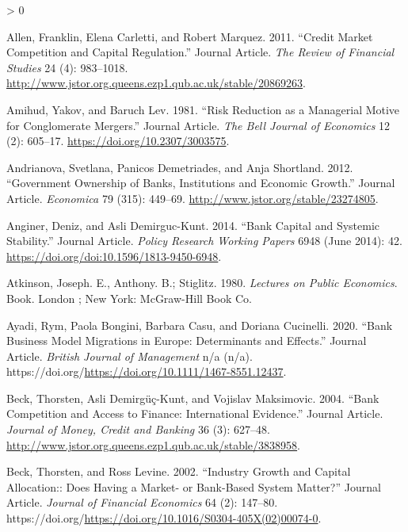 \documentclass{article}
\newlength{\cslhangindent}
\newenvironment{CSLReferences}[2] %
 {%
  \setlength{\parindent}{0pt}
  \ifodd #1 \everypar{\setlength{\hangindent}{\cslhangindent}}\ignorespaces\fi
  \ifnum #2 > 0
  \setlength{\parskip}{#2\baselineskip}
  \fi
 }%
 {}
\begin{document}
\hypertarget{refs}{}
\begin{CSLReferences}{1}{0}
\leavevmode\hypertarget{ref-RN15}{}%
Allen, Franklin, Elena Carletti, and Robert Marquez. 2011. {``Credit
Market Competition and Capital Regulation.''} Journal Article. \emph{The
Review of Financial Studies} 24 (4): 983--1018.
\url{http://www.jstor.org.queens.ezp1.qub.ac.uk/stable/20869263}.

\leavevmode\hypertarget{ref-RN16}{}%
Amihud, Yakov, and Baruch Lev. 1981. {``Risk Reduction as a Managerial
Motive for Conglomerate Mergers.''} Journal Article. \emph{The Bell
Journal of Economics} 12 (2): 605--17.
\url{https://doi.org/10.2307/3003575}.

\leavevmode\hypertarget{ref-RN17}{}%
Andrianova, Svetlana, Panicos Demetriades, and Anja Shortland. 2012.
{``Government Ownership of Banks, Institutions and Economic Growth.''}
Journal Article. \emph{Economica} 79 (315): 449--69.
\url{http://www.jstor.org/stable/23274805}.

\leavevmode\hypertarget{ref-RN18}{}%
Anginer, Deniz, and Asli Demirguc-Kunt. 2014. {``Bank Capital and
Systemic Stability.''} Journal Article. \emph{Policy Research Working
Papers} 6948 (June 2014): 42.
\url{https://doi.org/doi:10.1596/1813-9450-6948}.

\leavevmode\hypertarget{ref-RN20}{}%
Atkinson, Joseph. E., Anthony. B.; Stiglitz. 1980. \emph{Lectures on
Public Economics}. Book. London ; New York: McGraw-Hill Book Co.

\leavevmode\hypertarget{ref-RN21}{}%
Ayadi, Rym, Paola Bongini, Barbara Casu, and Doriana Cucinelli. 2020.
{``Bank Business Model Migrations in Europe: Determinants and
Effects.''} Journal Article. \emph{British Journal of Management} n/a
(n/a). https://doi.org/\url{https://doi.org/10.1111/1467-8551.12437}.

\leavevmode\hypertarget{ref-RN22}{}%
Beck, Thorsten, Asli Demirgüç-Kunt, and Vojislav Maksimovic. 2004.
{``Bank Competition and Access to Finance: International Evidence.''}
Journal Article. \emph{Journal of Money, Credit and Banking} 36 (3):
627--48.
\url{http://www.jstor.org.queens.ezp1.qub.ac.uk/stable/3838958}.

\leavevmode\hypertarget{ref-RN23}{}%
Beck, Thorsten, and Ross Levine. 2002. {``Industry Growth and Capital
Allocation:: Does Having a Market- or Bank-Based System Matter?''}
Journal Article. \emph{Journal of Financial Economics} 64 (2): 147--80.
https://doi.org/\url{https://doi.org/10.1016/S0304-405X(02)00074-0}.


\end{CSLReferences}
\end{document}
